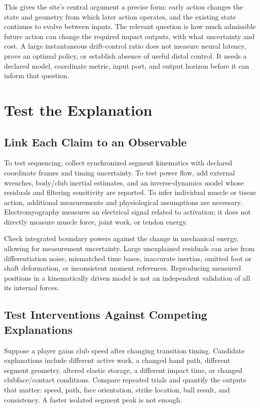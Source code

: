 This gives the site's central argument a precise form: early action changes the state and geometry from which later action operates, and the existing state continues to evolve between inputs. The relevant question is how much admissible future action can change the required impact outputs, with what uncertainty and cost. A large instantaneous drift-control ratio does not measure neural latency, prove an optimal policy, or establish absence of useful distal control. It needs a declared model, coordinate metric, input port, and output horizon before it can inform that question.

\section{Test the Explanation}
\subsection{Link Each Claim to an Observable}
To test sequencing, collect synchronized segment kinematics with declared coordinate frames and timing uncertainty. To test power flow, add external wrenches, body/club inertial estimates, and an inverse-dynamics model whose residuals and filtering sensitivity are reported. To infer individual muscle or tissue action, additional measurements and physiological assumptions are necessary. Electromyography measures an electrical signal related to activation; it does not directly measure muscle force, joint work, or tendon energy.

Check integrated boundary powers against the change in mechanical energy, allowing for measurement uncertainty. Large unexplained residuals can arise from differentiation noise, mismatched time bases, inaccurate inertias, omitted foot or shaft deformation, or inconsistent moment references. Reproducing measured positions in a kinematically driven model is not an independent validation of all its internal forces.

\subsection{Test Interventions Against Competing Explanations}
Suppose a player gains club speed after changing transition timing. Candidate explanations include different active work, a changed hand path, different segment geometry, altered elastic storage, a different impact time, or changed clubface/contact conditions. Compare repeated trials and quantify the outputs that matter: speed, path, face orientation, strike location, ball result, and consistency. A faster isolated segment peak is not enough.

